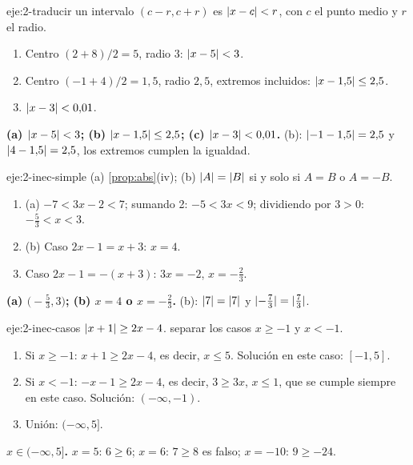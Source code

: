 \begin{solucion}{eje:2-traducir}
\planteamiento un intervalo $(c-r,c+r)$ es $\lvert x-c\rvert<r$, con $c$ el punto medio y $r$ el radio.
\pasos
\begin{enumerate}[label=(\alph*)]
  \item Centro $(2+8)/2=5$, radio $3$: $\lvert x-5\rvert<3$.
  \item Centro $(-1+4)/2=1{,}5$, radio $2{,}5$, extremos incluidos: $\lvert x-1{,}5\rvert\le2{,}5$.
  \item $\lvert x-3\rvert<0{,}01$.
\end{enumerate}
\resultado \textbf{(a) $\lvert x-5\rvert<3$; (b) $\lvert x-1{,}5\rvert\le2{,}5$; (c) $\lvert x-3\rvert<0{,}01$.}
\comprobacion (b): $\lvert-1-1{,}5\rvert=2{,}5$ y $\lvert4-1{,}5\rvert=2{,}5$, los extremos cumplen la igualdad.
\end{solucion}

\begin{solucion}{eje:2-inec-simple}
\planteamiento (a) \cref{prop:abs}(iv); (b) $\lvert A\rvert=\lvert B\rvert$ si y solo si $A=B$ o $A=-B$.
\pasos
\begin{enumerate}[label=\arabic*.]
  \item (a) $-7<3x-2<7$; sumando 2: $-5<3x<9$; dividiendo por $3>0$: $-\frac53<x<3$.
  \item (b) Caso $2x-1=x+3$: $x=4$.
  \item Caso $2x-1=-(x+3)$: $3x=-2$, $x=-\frac23$.
\end{enumerate}
\resultado \textbf{(a) $\bigl(-\frac53,3\bigr)$; (b) $x=4$ o $x=-\frac23$.}
\comprobacion (b): $\lvert7\rvert=\lvert7\rvert$ y $\lvert-\frac73\rvert=\lvert\frac73\rvert$.
\end{solucion}

\begin{solucion}{eje:2-inec-casos}
\datos $\lvert x+1\rvert\ge2x-4$.
\planteamiento separar los casos $x\ge-1$ y $x<-1$.
\pasos
\begin{enumerate}[label=\arabic*.]
  \item Si $x\ge-1$: $x+1\ge2x-4$, es decir, $x\le5$. Solución en este caso: $[-1,5]$.
  \item Si $x<-1$: $-x-1\ge2x-4$, es decir, $3\ge3x$, $x\le1$, que se cumple siempre en este caso. Solución: $(-\infty,-1)$.
  \item Unión: $(-\infty,5]$.
\end{enumerate}
\resultado \textbf{$x\in(-\infty,5]$.}
\comprobacion $x=5$: $6\ge6$; $x=6$: $7\ge8$ es falso; $x=-10$: $9\ge-24$.
\end{solucion}

